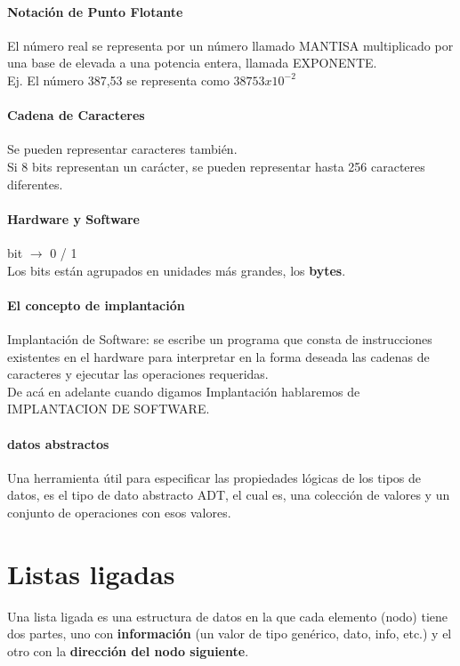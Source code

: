 \documentclass[10pt]{article}
\begin{document}
\paragraph{Notación de Punto Flotante}

El número real se representa por un número llamado MANTISA
multiplicado por una base de elevada a una potencia entera,
llamada EXPONENTE.\\
Ej. El número 387,53 se representa como $38753 x 10^{-2}$

\paragraph{Cadena de Caracteres}
Se pueden representar caracteres también.\\
Si 8 bits representan un carácter, se pueden representar hasta 256
caracteres diferentes.
\paragraph{Hardware y Software}
bit $\rightarrow$ 0 / 1\\
Los bits están agrupados en unidades más grandes, los
\textbf{bytes}.

\paragraph{El concepto de implantación}
Implantación de Software: se escribe un programa que
consta de instrucciones existentes en el hardware para
interpretar en la forma deseada las cadenas de
caracteres y ejecutar las operaciones requeridas.\\
De acá en adelante cuando digamos Implantación
hablaremos de IMPLANTACION DE SOFTWARE.\\

\paragraph{datos abstractos}
Una herramienta útil para especificar las propiedades lógicas de los
tipos de datos, es el tipo de dato abstracto ADT, el cual es, una
colección de valores y un conjunto de operaciones con esos
valores.

\section{Listas ligadas}
Una lista ligada es una estructura de datos en la que
cada elemento (nodo) tiene dos partes, uno con
\textbf{información} (un valor de tipo genérico, dato, info,
etc.) y el otro con la \textbf{dirección del nodo siguiente}.
\end{document}
